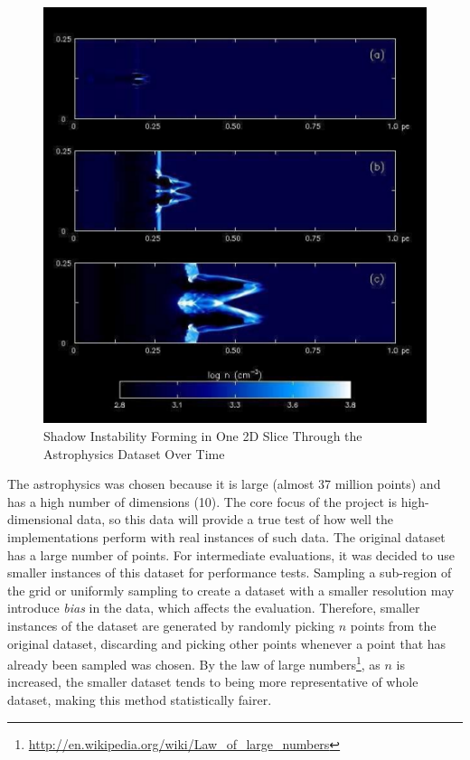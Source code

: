 \begin{figure}
	\vspace{-20pt}
	\begin{center}
		\includegraphics[scale=0.2]{figures/ionisation_front_instabilities.pdf}
	\end{center}
	\vspace{-20pt}
	\caption{Shadow Instability Forming in One 2D Slice Through the Astrophysics Dataset Over Time \cite{astrophysics-dataset}}
	\label{fig:ionisation-front-instabilities}
\end{figure}

The astrophysics was chosen because it is large (almost 37 million points) and has a high number of dimensions (10). The core focus of the project is high-dimensional data, so this data will provide a true test of how well the implementations perform with real instances of such data. The original dataset has a large number of points. For intermediate evaluations, it was decided to use smaller instances of this dataset for performance tests. Sampling a sub-region of the grid or uniformly sampling to create a dataset with a smaller resolution may introduce \textit{bias} in the data, which affects the evaluation. Therefore, smaller instances of the dataset are generated by randomly picking $n$ points from the original dataset, discarding and picking other points whenever a point that has already been sampled was chosen. By the law of large numbers\footnote{\url{http://en.wikipedia.org/wiki/Law_of_large_numbers}}, as $n$ is increased, the smaller dataset tends to being more representative of whole dataset, making this method statistically fairer.

